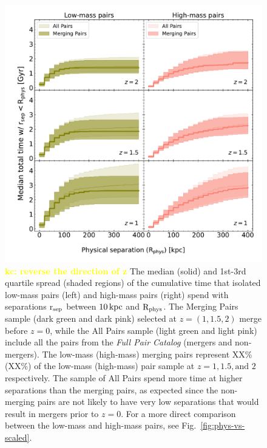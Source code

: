 \documentclass[twocolumn]{aastex631}
\newcommand{\kc}[1]{\textcolor{yellow}{\textbf{kc: #1}} }
\newcommand{\rsep}{\ensuremath{\rm r_{sep}}}
\newcommand{\paircat}{\textit{Full Pair Catalog}}
\newcommand{\Rphys}{\ensuremath{\rm R_{phys}}}
\newcommand{\rsep}{\ensuremath{\rm r_{sep}}}
\begin{document}
\begin{figure}[htb]
    \centering
    \includegraphics[width=\textwidth]{plots/bet-on-it/2_medtotal_LoHi_int.pdf}
    \caption{\kc{reverse the direction of z} 
    The median (solid) and 1st-3rd quartile spread (shaded regions) of the cumulative time that isolated low-mass pairs (left) and high-mass pairs (right) spend with separations \rsep{} between $10\mathrm{\,kpc}$ and \Rphys{}. 
    The Merging Pairs sample (dark green and dark pink) selected at $z=(1,1.5,2)$ merge before $z=0$, while the All Pairs sample (light green and light pink) include all the pairs from the \paircat{} (mergers and non-mergers).  
    The low-mass (high-mass) merging pairs represent XX\%(XX\%) of the low-mass (high-mass) pair sample at $z=1,1.5, \mbox{and } 2$ respectively. 
    The sample of All Pairs spend more time at higher separations than the merging pairs, as expected since the non-merging pairs are not likely to have very low separations that would result in mergers prior to $z=0$. 
    For a more direct comparison between the low-mass and high-mass pairs, see Fig.~\ref{fig:phys-vs-scaled}. 
    }
    \label{fig:low-vs-high}
\end{figure}
\end{document}
